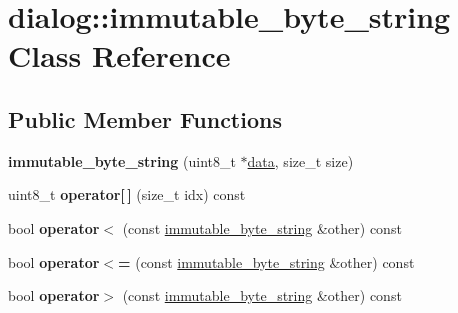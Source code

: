 \hypertarget{classdialog_1_1immutable__byte__string}{}\section{dialog\+:\+:immutable\+\_\+byte\+\_\+string Class Reference}
\label{classdialog_1_1immutable__byte__string}
\subsection*{Public Member Functions}
\begin{DoxyCompactItemize}
\item 
\mbox{\label{classdialog_1_1immutable__byte__string_aadbd27b258a8fb7b8cee2f43b4883622}} 
{\bfseries immutable\+\_\+byte\+\_\+string} (uint8\+\_\+t $\ast$\hyperlink{structdialog_1_1data}{data}, size\+\_\+t size)
\item 
\mbox{\label{classdialog_1_1immutable__byte__string_a4dd31701ea9a80c778b329719bcffa33}} 
uint8\+\_\+t {\bfseries operator\mbox{[}$\,$\mbox{]}} (size\+\_\+t idx) const
\item 
\mbox{\label{classdialog_1_1immutable__byte__string_a6c1732b940381d01bcd1cb429217ef4d}} 
bool {\bfseries operator$<$} (const \hyperlink{classdialog_1_1immutable__byte__string}{immutable\+\_\+byte\+\_\+string} \&other) const
\item 
\mbox{\label{classdialog_1_1immutable__byte__string_a8437a3f7ef025ddcc73c1a9abc5914d5}} 
bool {\bfseries operator$<$=} (const \hyperlink{classdialog_1_1immutable__byte__string}{immutable\+\_\+byte\+\_\+string} \&other) const
\item 
\mbox{\label{classdialog_1_1immutable__byte__string_a03cd06f0e8ef14bf627e13dd62aa3264}} 
bool {\bfseries operator$>$} (const \hyperlink{classdialog_1_1immutable__byte__string}{immutable\+\_\+byte\+\_\+string} \&other) const
\item 
\mbox{\label{classdialog_1_1immutable__byte__string_a75752397b2d85b104d92852ed8e79475}} 

\end{DoxyCompactItemize}
